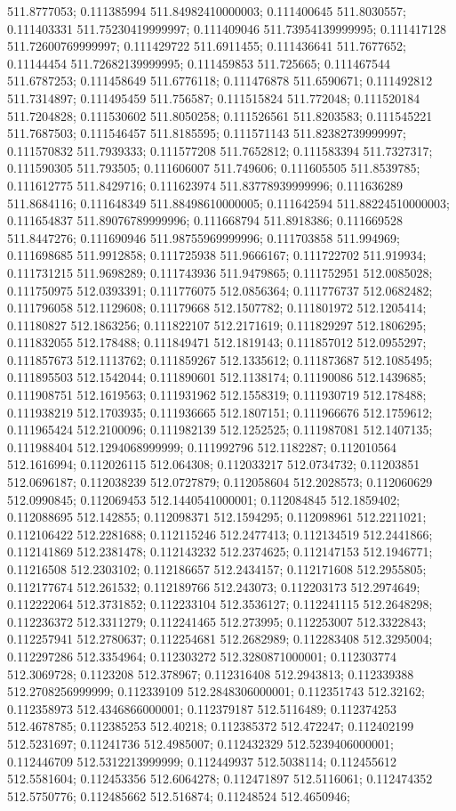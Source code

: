 511.8777053; 0.111385994 511.84982410000003; 0.111400645 511.8030557; 0.111403331 511.75230419999997; 0.111409046 511.73954139999995; 0.111417128 511.72600769999997; 0.111429722 511.6911455; 0.111436641 511.7677652; 0.11144454 511.72682139999995; 0.111459853 511.725665; 0.111467544 511.6787253; 0.111458649 511.6776118; 0.111476878 511.6590671; 0.111492812 511.7314897; 0.111495459 511.756587; 0.111515824 511.772048; 0.111520184 511.7204828; 0.111530602 511.8050258; 0.111526561 511.8203583; 0.111545221 511.7687503; 0.111546457 511.8185595; 0.111571143 511.82382739999997; 0.111570832 511.7939333; 0.111577208 511.7652812; 0.111583394 511.7327317; 0.111590305 511.793505; 0.111606007 511.749606; 0.111605505 511.8539785; 0.111612775 511.8429716; 0.111623974 511.83778939999996; 0.111636289 511.8684116; 0.111648349 511.88498610000005; 0.111642594 511.88224510000003; 0.111654837 511.89076789999996; 0.111668794 511.8918386; 0.111669528 511.8447276; 0.111690946 511.98755969999996; 0.111703858 511.994969; 0.111698685 511.9912858; 0.111725938 511.9666167; 0.111722702 511.919934; 0.111731215 511.9698289; 0.111743936 511.9479865; 0.111752951 512.0085028; 0.111750975 512.0393391; 0.111776075 512.0856364; 0.111776737 512.0682482; 0.111796058 512.1129608; 0.11179668 512.1507782; 0.111801972 512.1205414; 0.11180827 512.1863256; 0.111822107 512.2171619; 0.111829297 512.1806295; 0.111832055 512.178488; 0.111849471 512.1819143; 0.111857012 512.0955297; 0.111857673 512.1113762; 0.111859267 512.1335612; 0.111873687 512.1085495; 0.111895503 512.1542044; 0.111890601 512.1138174; 0.11190086 512.1439685; 0.111908751 512.1619563; 0.111931962 512.1558319; 0.111930719 512.178488; 0.111938219 512.1703935; 0.111936665 512.1807151; 0.111966676 512.1759612; 0.111965424 512.2100096; 0.111982139 512.1252525; 0.111987081 512.1407135; 0.111988404 512.1294068999999; 0.111992796 512.1182287; 0.112010564 512.1616994; 0.112026115 512.064308; 0.112033217 512.0734732; 0.11203851 512.0696187; 0.112038239 512.0727879; 0.112058604 512.2028573; 0.112060629 512.0990845; 0.112069453 512.1440541000001; 0.112084845 512.1859402; 0.112088695 512.142855; 0.112098371 512.1594295; 0.112098961 512.2211021; 0.112106422 512.2281688; 0.112115246 512.2477413; 0.112134519 512.2441866; 0.112141869 512.2381478; 0.112143232 512.2374625; 0.112147153 512.1946771; 0.11216508 512.2303102; 0.112186657 512.2434157; 0.112171608 512.2955805; 0.112177674 512.261532; 0.112189766 512.243073; 0.112203173 512.2974649; 0.112222064 512.3731852; 0.112233104 512.3536127; 0.112241115 512.2648298; 0.112236372 512.3311279; 0.112241465 512.273995; 0.112253007 512.3322843; 0.112257941 512.2780637; 0.112254681 512.2682989; 0.112283408 512.3295004; 0.112297286 512.3354964; 0.112303272 512.3280871000001; 0.112303774 512.3069728; 0.1123208 512.378967; 0.112316408 512.2943813; 0.112339388 512.2708256999999; 0.112339109 512.2848306000001; 0.112351743 512.32162; 0.112358973 512.4346866000001; 0.112379187 512.5116489; 0.112374253 512.4678785; 0.112385253 512.40218; 0.112385372 512.472247; 0.112402199 512.5231697; 0.11241736 512.4985007; 0.112432329 512.5239406000001; 0.112446709 512.5312213999999; 0.112449937 512.5038114; 0.112455612 512.5581604; 0.112453356 512.6064278; 0.112471897 512.5116061; 0.112474352 512.5750776; 0.112485662 512.516874; 0.11248524 512.4650946; 